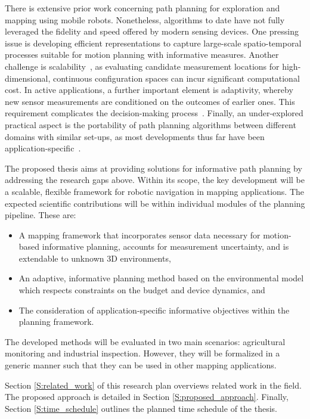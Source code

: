 There is extensive prior work concerning path planning for exploration and 
mapping using mobile robots. Nonetheless, algorithms to date have not fully leveraged the fidelity and speed 
offered by modern sensing devices. One pressing issue is developing efficient representations to capture 
large-scale spatio-temporal processes suitable for motion planning with informative measures. Another 
challenge is scalability~\cite{Hollinger2014}, as evaluating candidate measurement locations for 
high-dimensional, continuous configuration spaces can incur significant computational cost. In active 
applications, a further important element is adaptivity, whereby new sensor measurements are conditioned 
on the outcomes of earlier ones. This requirement complicates the decision-making process~\cite{Lim2015}. 
Finally, an under-explored practical aspect is the portability of path planning algorithms 
between different domains with similar set-ups, as most developments thus far have been 
application-specific~\cite{Dunbabin2012}.

The proposed thesis aims at providing solutions for informative path planning by addressing the research 
gaps above. Within its scope, the key development will be a scalable, flexible framework for robotic 
navigation in mapping applications. The expected scientific contributions will be within individual 
modules of the planning pipeline. These are:

\begin{itemize}
 \item A mapping framework that incorporates sensor data necessary for motion-based informative 
planning, accounts for measurement uncertainty, and is extendable to unknown 3D environments,
 \item An adaptive, informative planning method based on the environmental model which respects constraints 
on the budget and device dynamics, and
 \item The consideration of application-specific informative objectives within the planning framework.
\end{itemize}

The developed methods will be evaluated in two main scenarios: agricultural monitoring and industrial 
inspection. However, they will be formalized in a generic manner such that they can be used in other 
mapping applications.

Section \ref{S:related_work} of this research plan overviews related work in the field. The proposed 
approach is detailed in Section \ref{S:proposed_approach}. Finally, 
Section \ref{S:time_schedule} outlines the planned time schedule of the thesis.